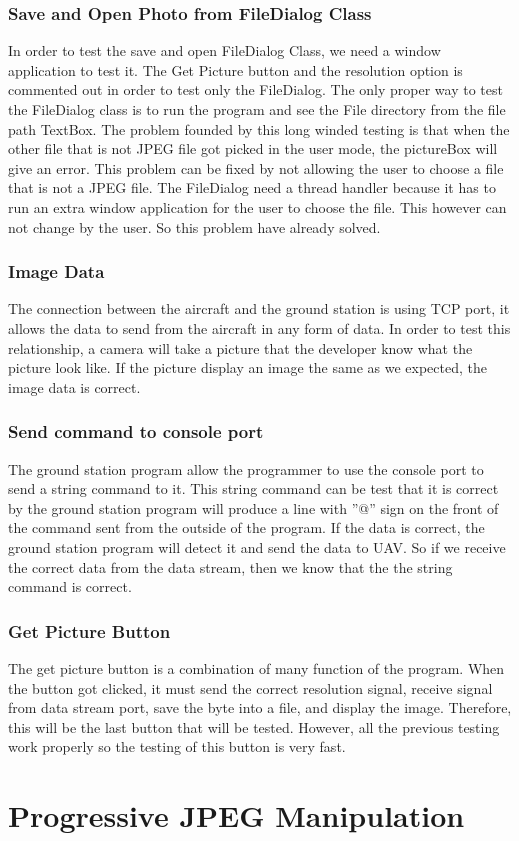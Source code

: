 \subsubsection*{Save and Open Photo from FileDialog Class}
In order to test the save and open FileDialog Class, we need a window application to test it. The  Get Picture button and the resolution option is commented out in order to test only the FileDialog. The only proper way to test the FileDialog class is to run the program and see the File directory from the file path TextBox. The problem founded by this long winded testing is that when the other file that is not JPEG file got picked in the user mode, the pictureBox will give an error. This problem can be fixed by not allowing the user to choose a file that is not a JPEG file. The FileDialog need a thread handler because it has to run an extra window application for the user to choose the file. This however can not change by the user. So this problem have already solved.
\subsubsection*{Image Data}
The connection between the aircraft and the ground station is using TCP port, it allows the data to send from the aircraft in any form of data. In order to test this relationship, a camera will take a picture that the developer know what the picture look like. If the picture display an image the same as we expected, the image data is correct. 
\subsubsection*{Send command to console port}
The ground station program allow the programmer to use the console port to send a string command to it. This string command can be test that it is correct by the ground station program will produce a line with ''@'' sign on the front of the command sent from the outside of the program.
If the data is correct, the ground station program will detect it and send the data to UAV. So if we receive the correct data from the data stream, then we know that the the string command is correct.
\subsubsection*{Get Picture Button}
The get picture button is a combination of many function of the program. When the button got clicked, it must send the correct resolution signal, receive signal from data stream port, save the byte into a file, and display the image. Therefore, this will be the last button that will be tested. However, all the previous testing work properly so the testing of this button is very fast.

\section{Progressive JPEG Manipulation}

